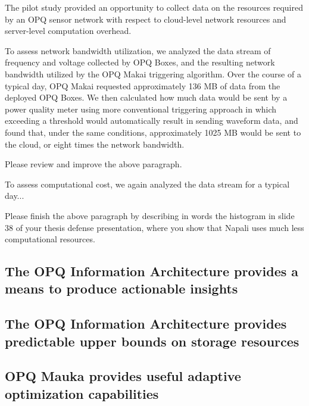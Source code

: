 The pilot study provided an opportunity to collect data on the resources required by an OPQ sensor network with respect to cloud-level network resources and server-level computation overhead.

To assess network bandwidth utilization, we analyzed the data stream of frequency and voltage collected by OPQ Boxes, and the resulting network bandwidth utilized by the OPQ Makai triggering algorithm. Over the course of a typical day, OPQ Makai requested approximately 136 MB of data from the deployed OPQ Boxes.  We then calculated how much data would be sent by a power quality meter using more conventional triggering approach in which exceeding a threshold would automatically result in sending waveform data, and found that, under the same conditions, approximately 1025 MB would be sent to the cloud, or eight times the network bandwidth.

\begin{tcolorbox}[colback=blue!5!white,colframe=blue!75!black,title=SERGE]
Please review and improve the above paragraph.
\end{tcolorbox}

To assess computational cost, we again analyzed the data stream for a typical day...

\begin{tcolorbox}[colback=blue!5!white,colframe=blue!75!black,title=SERGE]
Please finish the above paragraph by describing in words the histogram in slide 38 of your thesis defense presentation, where you show that Napali uses much less computational resources.
\end{tcolorbox}

\subsection{The OPQ Information Architecture provides a means to produce actionable insights}

\subsection{The OPQ Information Architecture provides predictable upper bounds on storage resources}

\subsection{OPQ Mauka provides useful adaptive optimization capabilities}



